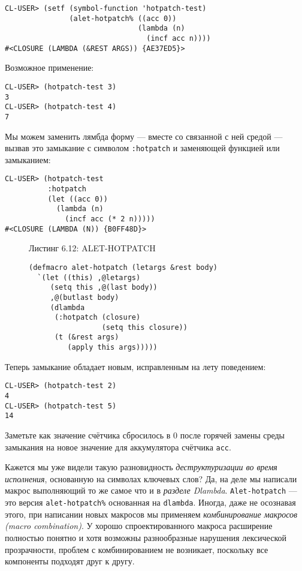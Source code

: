 \begin{verbatim}
CL-USER> (setf (symbol-function 'hotpatch-test)
               (alet-hotpatch% ((acc 0))
                               (lambda (n)
                                 (incf acc n))))
#<CLOSURE (LAMBDA (&REST ARGS)) {AE37ED5}>
\end{verbatim}

Возможное применение:

\begin{verbatim}
CL-USER> (hotpatch-test 3)
3
CL-USER> (hotpatch-test 4)
7
\end{verbatim}

Мы можем заменить лямбда форму --- вместе со связанной с ней средой --- вызвав это замыкание с символом \verb":hotpatch" и заменяющей функцией или замыканием:

\begin{verbatim}
CL-USER> (hotpatch-test
          :hotpatch
          (let ((acc 0))
            (lambda (n)
              (incf acc (* 2 n)))))
#<CLOSURE (LAMBDA (N)) {B0FF48D}>
\end{verbatim}

\begin{figure}Листинг 6.12: ALET-HOTPATCH\label{listing_6.12}
\listbegin
\begin{verbatim}
(defmacro alet-hotpatch (letargs &rest body)
  `(let ((this) ,@letargs)
     (setq this ,@(last body))
     ,@(butlast body)
     (dlambda
      (:hotpatch (closure)
                 (setq this closure))
      (t (&rest args)
         (apply this args)))))
\end{verbatim}
\listend
\end{figure}

Теперь замыкание обладает новым, исправленным на лету поведением:

\begin{verbatim}
CL-USER> (hotpatch-test 2)
4
CL-USER> (hotpatch-test 5)
14
\end{verbatim}

Заметьте как значение счётчика сбросилось в 0 после горячей замены среды замыкания на новое значение для аккумулятора счётчика \verb"acc".

Кажется мы уже видели такую разновидность \emph{деструктуризации во время исполнения}, основанную на символах ключевых слов? Да, на деле мы написали макрос выполняющий то же самое что и в \emph{разделе Dlambda}. \verb"Alet-hotpatch" --- это версия \verb"alet-hotpatch%" основанная на \verb"dlambda". Иногда, даже не осознавая этого, при написании новых макросов мы применяем \emph{комбинирование макросов (macro combination)}. У хорошо спроектированного макроса расширение полностью понятно и хотя возможны разнообразные нарушения лексической прозрачности, проблем с комбинированием не возникает, поскольку все компоненты подходят друг к другу.

